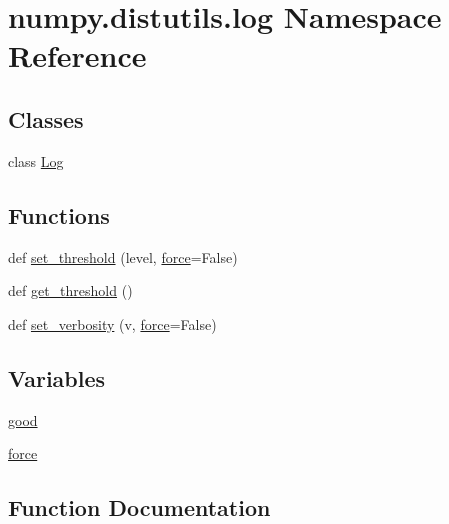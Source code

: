 \hypertarget{namespacenumpy_1_1distutils_1_1log}{}\section{numpy.\+distutils.\+log Namespace Reference}
\label{namespacenumpy_1_1distutils_1_1log}
\subsection*{Classes}
\begin{DoxyCompactItemize}
\item 
class \hyperlink{classnumpy_1_1distutils_1_1log_1_1Log}{Log}
\end{DoxyCompactItemize}
\subsection*{Functions}
\begin{DoxyCompactItemize}
\item 
def \hyperlink{namespacenumpy_1_1distutils_1_1log_a42d67b77d6c5cca0a51a6c7bfea639ad}{set\+\_\+threshold} (level, \hyperlink{namespacenumpy_1_1distutils_1_1log_af2438e339a2894a64f82ccd7fbbf23ba}{force}=False)
\item 
def \hyperlink{namespacenumpy_1_1distutils_1_1log_a5e82966cc3c9bb3658ce05c4226f0045}{get\+\_\+threshold} ()
\item 
def \hyperlink{namespacenumpy_1_1distutils_1_1log_a5a7ab48497fbf0859c50798079bed54e}{set\+\_\+verbosity} (v, \hyperlink{namespacenumpy_1_1distutils_1_1log_af2438e339a2894a64f82ccd7fbbf23ba}{force}=False)
\end{DoxyCompactItemize}
\subsection*{Variables}
\begin{DoxyCompactItemize}
\item 
\hyperlink{namespacenumpy_1_1distutils_1_1log_ad7a259dc53e55c9ee179f4b30b16b1a5}{good}
\item 
\hyperlink{namespacenumpy_1_1distutils_1_1log_af2438e339a2894a64f82ccd7fbbf23ba}{force}
\end{DoxyCompactItemize}


\subsection{Function Documentation}
\mbox{\label{namespacenumpy_1_1distutils_1_1log_a5e82966cc3c9bb3658ce05c4226f0045}} 
